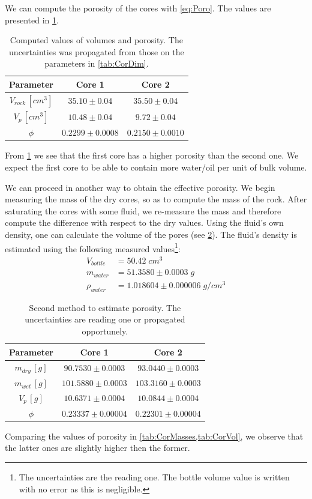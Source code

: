\documentclass[10pt, a4paper]{amsart}
\begin{document}
We can compute the porosity of the cores with \cref{eq:Poro}. The values are presented in \cref{tab:CorVol}.
\begin{table}[H]
    \centering
    \begin{tabular}{ccc}
    \toprule
        Parameter & Core 1 & Core 2 \\
    \midrule
        $V_{rock} \,[cm^3]$ & $35.10 \pm 0.04$ & $35.50 \pm 0.04$ \\
        $V_{p} \, [cm^3]$ & $10.48 \pm 0.04$ & $9.72 \pm 0.04$ \\
        $\phi$ & $0.2299 \pm 0.0008$ & $0.2150 \pm 0.0010$\\
    \bottomrule
    \end{tabular}
    \caption{Computed values of volumes and porosity. The uncertainties was propagated from those on the parameters in \cref{tab:CorDim}.}
    \label{tab:CorVol}
\end{table}
From \cref{tab:CorVol} we see that the first core has a higher porosity than the second one. We expect the first core to be able to contain more water/oil per unit of bulk volume.

We can proceed in another way to obtain the effective porosity. We begin measuring the mass of the dry cores, so as to compute the mass of the rock. After saturating the cores with some fluid, we re-measure the mass and therefore compute the difference with respect to the dry values. Using the fluid's own density, one can calculate the volume of the pores (see \cref{tab:CorMasses}). The fluid's density is estimated using the following measured values\footnote{The uncertainties are the reading one. The bottle volume value is written with no error as this is negligible.}:
\begin{align}
     V_{bottle}&=50.42\;cm^3\nonumber\\ m_{water}&=51.3580 \pm 0.0003\;g\nonumber\\ \rho_{water}&=1.018604 \pm 0.000006\;g/cm^3
\end{align}
\begin{table}[H]
    \centering
    \begin{tabular}{ccc}
    \toprule
        Parameter & Core 1 & Core 2\\
    \midrule
        $m_{dry} \, [g]$ & $90.7530 \pm 0.0003$ & $93.0440 \pm 0.0003$ \\
        $m_{wet} \, [g]$ & $101.5880 \pm 0.0003$ & $103.3160 \pm 0.0003$ \\
        $V_{p} \, [g]$ & $10.6371 \pm 0.0004$ & $10.0844 \pm 0.0004$ \\
        $\phi$ & $0.23337\pm0.00004$ & $0.22301\pm0.00004$ \\
    \bottomrule
    \end{tabular}
    \caption{Second method to estimate porosity. The uncertainties are reading one or propagated opportunely.}
    \label{tab:CorMasses}
\end{table}
Comparing the values of porosity in \cref{tab:CorMasses,tab:CorVol}, we observe that the latter ones are slightly higher then the former.
\end{document}
